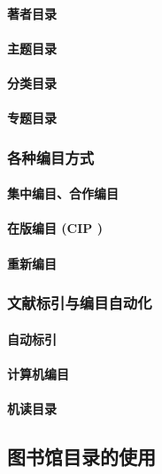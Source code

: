 \documentclass[UTF8]{../../ApplicationUniverse}
\begin{document}
            \paragraph{著者目录}
            \paragraph{主题目录}
            \paragraph{分类目录}
            \paragraph{专题目录}
        \subsubsection{各种编目方式}
            \paragraph{集中编目、合作编目}
            \paragraph{在版编目 (CIP )}
            \paragraph{重新编目}
        \subsubsection{文献标引与编目自动化}
            \paragraph{自动标引}
            \paragraph{计算机编目}
            \paragraph{机读目录}
    \subsection{图书馆目录的使用}
\end{document}
